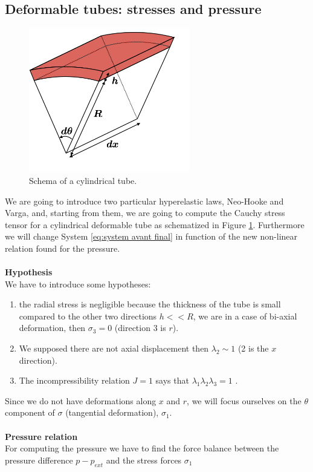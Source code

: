 \documentclass[12pt,a4paper]{article}
\numberwithin{equation}{section}
\begin{document}
\subsection{Deformable tubes: stresses and pressure}
\begin{figure}
\centering
\includegraphics[width=7cm]{solid.png}
\caption{Schema of a cylindrical tube.}
\label{fig:solid}
\end{figure}
We are going to introduce two particular hyperelastic laws, Neo-Hooke and Varga, and, starting from them, we are going to compute the Cauchy stress tensor for a cylindrical deformable tube as schematized in Figure \ref{fig:solid}. Furthermore we will change System \ref{eq:system avant final} in function of the new non-linear relation found for the pressure. \\
\\
{\bf Hypothesis}\\
We have to introduce some hypotheses:
\begin{enumerate}
\item the radial stress is negligible because the thickness of the tube is small compared to the other two directions $h << R$, we are in a case of bi-axial deformation, then $\sigma_3 = 0$ (direction 3 is $r$).
\item We supposed there are not axial displacement then $\lambda_2 \sim 1$ (2 is the $x$ direction).
\item The incompressibility relation $J=1$ says that $\lambda_1 \lambda_2\lambda_3 = 1$ .
\end{enumerate}
Since we do not have deformations along $x$ and $r$, we will focus ourselves on the $\theta$ component of $\sigma$ (tangential deformation), $\sigma_1$.\\
\\
{\bf Pressure relation}\\
 For computing the pressure we have to find the force balance between the pressure difference $p - p_{ext}$ and the stress forces $\sigma_1$ 
\end{document}
